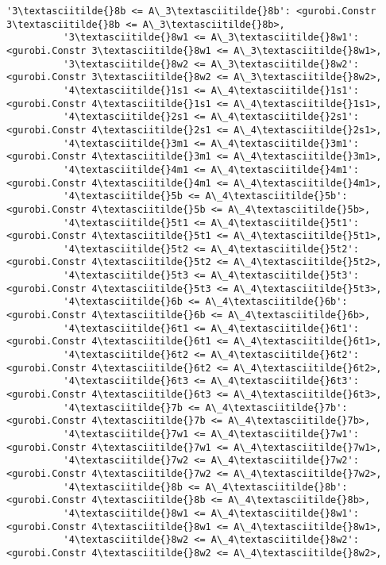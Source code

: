 \documentclass[11pt]{article}
\begin{document}
\begin{Verbatim}[commandchars=\\\{\}]
          '3\textasciitilde{}8b <= A\_3\textasciitilde{}8b': <gurobi.Constr 3\textasciitilde{}8b <= A\_3\textasciitilde{}8b>,
          '3\textasciitilde{}8w1 <= A\_3\textasciitilde{}8w1': <gurobi.Constr 3\textasciitilde{}8w1 <= A\_3\textasciitilde{}8w1>,
          '3\textasciitilde{}8w2 <= A\_3\textasciitilde{}8w2': <gurobi.Constr 3\textasciitilde{}8w2 <= A\_3\textasciitilde{}8w2>,
          '4\textasciitilde{}1s1 <= A\_4\textasciitilde{}1s1': <gurobi.Constr 4\textasciitilde{}1s1 <= A\_4\textasciitilde{}1s1>,
          '4\textasciitilde{}2s1 <= A\_4\textasciitilde{}2s1': <gurobi.Constr 4\textasciitilde{}2s1 <= A\_4\textasciitilde{}2s1>,
          '4\textasciitilde{}3m1 <= A\_4\textasciitilde{}3m1': <gurobi.Constr 4\textasciitilde{}3m1 <= A\_4\textasciitilde{}3m1>,
          '4\textasciitilde{}4m1 <= A\_4\textasciitilde{}4m1': <gurobi.Constr 4\textasciitilde{}4m1 <= A\_4\textasciitilde{}4m1>,
          '4\textasciitilde{}5b <= A\_4\textasciitilde{}5b': <gurobi.Constr 4\textasciitilde{}5b <= A\_4\textasciitilde{}5b>,
          '4\textasciitilde{}5t1 <= A\_4\textasciitilde{}5t1': <gurobi.Constr 4\textasciitilde{}5t1 <= A\_4\textasciitilde{}5t1>,
          '4\textasciitilde{}5t2 <= A\_4\textasciitilde{}5t2': <gurobi.Constr 4\textasciitilde{}5t2 <= A\_4\textasciitilde{}5t2>,
          '4\textasciitilde{}5t3 <= A\_4\textasciitilde{}5t3': <gurobi.Constr 4\textasciitilde{}5t3 <= A\_4\textasciitilde{}5t3>,
          '4\textasciitilde{}6b <= A\_4\textasciitilde{}6b': <gurobi.Constr 4\textasciitilde{}6b <= A\_4\textasciitilde{}6b>,
          '4\textasciitilde{}6t1 <= A\_4\textasciitilde{}6t1': <gurobi.Constr 4\textasciitilde{}6t1 <= A\_4\textasciitilde{}6t1>,
          '4\textasciitilde{}6t2 <= A\_4\textasciitilde{}6t2': <gurobi.Constr 4\textasciitilde{}6t2 <= A\_4\textasciitilde{}6t2>,
          '4\textasciitilde{}6t3 <= A\_4\textasciitilde{}6t3': <gurobi.Constr 4\textasciitilde{}6t3 <= A\_4\textasciitilde{}6t3>,
          '4\textasciitilde{}7b <= A\_4\textasciitilde{}7b': <gurobi.Constr 4\textasciitilde{}7b <= A\_4\textasciitilde{}7b>,
          '4\textasciitilde{}7w1 <= A\_4\textasciitilde{}7w1': <gurobi.Constr 4\textasciitilde{}7w1 <= A\_4\textasciitilde{}7w1>,
          '4\textasciitilde{}7w2 <= A\_4\textasciitilde{}7w2': <gurobi.Constr 4\textasciitilde{}7w2 <= A\_4\textasciitilde{}7w2>,
          '4\textasciitilde{}8b <= A\_4\textasciitilde{}8b': <gurobi.Constr 4\textasciitilde{}8b <= A\_4\textasciitilde{}8b>,
          '4\textasciitilde{}8w1 <= A\_4\textasciitilde{}8w1': <gurobi.Constr 4\textasciitilde{}8w1 <= A\_4\textasciitilde{}8w1>,
          '4\textasciitilde{}8w2 <= A\_4\textasciitilde{}8w2': <gurobi.Constr 4\textasciitilde{}8w2 <= A\_4\textasciitilde{}8w2>,

\end{Verbatim}
\end{document}
